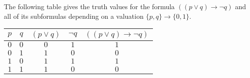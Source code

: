 \begin{exl}
\label{exl:TruthTable}
The following table gives the truth values for the formula $((p \vee q) \to \neg q)$ and all of its subformulas
depending on a valuation $\{p, q\} \to \{0,1\}$.
\begin{center}
\begin{tabular}{|c|c|c|c|c|}
\hline
$p$ & $q$ & $(p \vee q)$ & $\neg q$ & $((p \vee q) \to \neg q)$\\\hline
$0$ & $0$ & $0$ & $1$ & $1$\\\hline
$0$ & $1$ & $1$ & $0$ & $0$\\\hline
$1$ & $0$ & $1$ & $1$ & $1$\\\hline
$1$ & $1$ & $1$ & $0$ & $0$\\\hline
\end{tabular}
\end{center}
\end{exl}